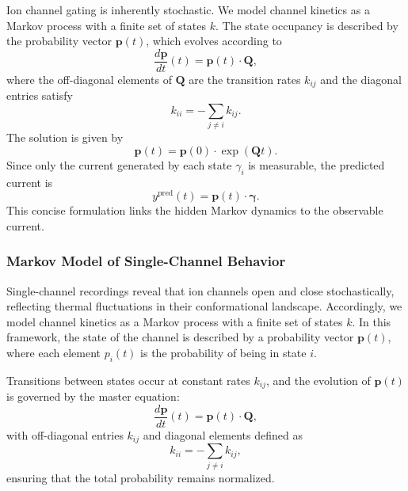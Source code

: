 \documentclass[pdflatex,sn-mathphys-num]{sn-jnl}%
\theoremstyle{thmstyleone}%
\theoremstyle{thmstyletwo}%
\theoremstyle{thmstylethree}%
\begin{document}
Ion channel gating is inherently stochastic. We model channel kinetics as a Markov process with a finite set of states \(k\). The state occupancy is described by the probability vector \(\boldsymbol{p}(t)\), which evolves according to
\begin{equation}
	\frac{d\boldsymbol{p}}{dt}(t) = \boldsymbol{p}(t)\cdot \boldsymbol{Q},
	\label{eq:master_equation_short}
\end{equation}
where the off-diagonal elements of \(\boldsymbol{Q}\) are the transition rates \(k_{ij}\) and the diagonal entries satisfy
\begin{equation}
	k_{ii} = -\sum_{j\neq i} k_{ij}.
	\label{eq:Q_diag_short}
\end{equation}
The solution is given by
\begin{equation}
	\boldsymbol{p}(t) = \boldsymbol{p}(0) \cdot \exp(\boldsymbol{Q}t).
	\label{eq:solution_short}
\end{equation}
Since only the current generated by each state \(\gamma_i\) is measurable, the predicted current is
\begin{equation}
	y^{\text{pred}}(t) = \boldsymbol{p}(t)\cdot \boldsymbol{\gamma}.
	\label{eq:current_pred_short}
\end{equation}
This concise formulation links the hidden Markov dynamics to the observable current.

\subsubsection{Markov Model of Single-Channel Behavior}

Single-channel recordings reveal that ion channels open and close stochastically, reflecting thermal fluctuations in their conformational landscape. Accordingly, we model channel kinetics as a Markov process with a finite set of states \(k\). In this framework, the state of the channel is described by a probability vector \(\boldsymbol{p}(t)\), where each element \(p_i(t)\) is the probability of being in state \(i\).

Transitions between states occur at constant rates \(k_{ij}\), and the evolution of \(\boldsymbol{p}(t)\) is governed by the master equation:
\begin{equation}
	\frac{d \boldsymbol{p}}{dt}(t) = \boldsymbol{p}(t) \cdot \boldsymbol{Q},
	\label{eq:master_equation}
\end{equation}
with off-diagonal entries \(k_{ij}\) and diagonal elements defined as
\begin{equation}
	k_{ii} = -\sum_{j\neq i} k_{ij},
	\label{eq:Q_diagonal_element}
\end{equation}
ensuring that the total probability remains normalized.
\end{document}
